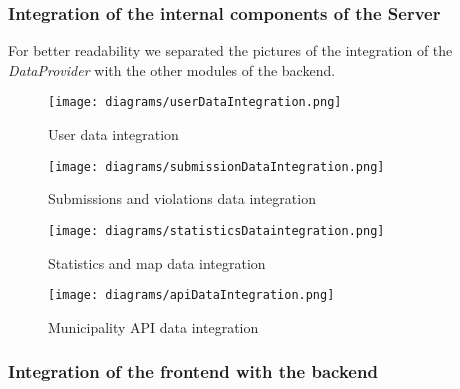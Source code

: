         \subsubsection{Integration of the internal components of the Server}
            
            For better readability we separated the pictures of the integration of the \emph{DataProvider} with the other modules of the backend.\\

            \begin{figure}[h]
                \centering
                \texttt{[image: diagrams/userDataIntegration.png]}
                \caption{
                    \label{fig:userDataIntegration} 
                    User data integration
                }
            \end{figure}
            
            \begin{figure}[h]
                \centering
                \texttt{[image: diagrams/submissionDataIntegration.png]}
                \caption{
                    \label{fig:submissionDataIntegration} 
                    Submissions and violations data integration
                }
            \end{figure}
            
            \begin{figure}[h]
                \centering
                \texttt{[image: diagrams/statisticsDataintegration.png]}
                \caption{
                    \label{fig:statisticsDataIntegration} 
                    Statistics and map data integration
                }
            \end{figure}
             
            \begin{figure}[h]
                \centering
                \texttt{[image: diagrams/apiDataIntegration.png]}
                \caption{
                    \label{fig:apiDataIntegration} 
                    Municipality API data integration
                }
            \end{figure}
            \clearpage

        \subsubsection{Integration of the frontend with the backend}
            
